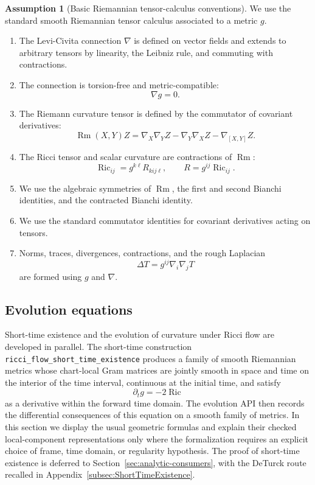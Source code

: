 \documentclass[11pt]{article}
\theoremstyle{plain}
\theoremstyle{definition}
\newtheorem{assumption}[theorem]{Assumption}
\theoremstyle{remark}
\newcommand{\Ric}{\operatorname{Ric}}
\newcommand{\Rm}{\operatorname{Rm}}
\newcommand{\leanref}[1]{\nolinkurl{#1}}
\begin{document}
\begin{assumption}[Basic Riemannian tensor-calculus conventions]
\label{ass:riemannian-calculus}
We use the standard smooth Riemannian tensor calculus associated to a metric
$g$.
\begin{enumerate}[label=(\arabic*)]
  \item The Levi-Civita connection $\nabla$ is defined on vector fields and
  extends to arbitrary tensors by linearity, the Leibniz rule, and commuting
  with contractions.

  \item The connection is torsion-free and metric-compatible:
  \[
  \nabla g=0.
  \]

  \item The Riemann curvature tensor is defined by the commutator of covariant
  derivatives:
  \[
  \Rm(X,Y)Z
  =
  \nabla_X\nabla_YZ
  -\nabla_Y\nabla_XZ
  -\nabla_{[X,Y]}Z.
  \]

  \item The Ricci tensor and scalar curvature are contractions of $\Rm$:
  \[
  \Ric_{ij}=g^{k\ell}R_{kij\ell},
  \qquad
  R=g^{ij}\Ric_{ij}.
  \]

  \item We use the algebraic symmetries of $\Rm$, the first and second Bianchi
  identities, and the contracted Bianchi identity.

  \item We use the standard commutator identities for covariant derivatives
  acting on tensors.

  \item Norms, traces, divergences, contractions, and the rough Laplacian
  \[
  \Delta T=g^{ij}\nabla_i\nabla_jT
  \]
  are formed using $g$ and $\nabla$.
\end{enumerate}
\end{assumption}

\subsection{Evolution equations}

Short-time existence and the evolution of curvature under Ricci flow are
developed in parallel.  The short-time construction
\leanref{ricci_flow_short_time_existence} produces a family of smooth
Riemannian metrics whose chart-local Gram matrices are jointly smooth in space
and time on the interior of the time interval, continuous at the initial time,
and satisfy
\[
  \partial_t g=-2\Ric
\]
as a derivative within the forward time domain.  The evolution API then records
the differential consequences of this equation on a smooth family of metrics.
In this section we display the usual geometric formulas and explain their
checked local-component representations only where the formalization requires an
explicit choice of frame, time domain, or regularity hypothesis.  The proof of
short-time existence is deferred to Section~\ref{sec:analytic-consumers}, with
the DeTurck route recalled in Appendix~\ref{subsec:ShortTimeExistence}.
\end{document}
